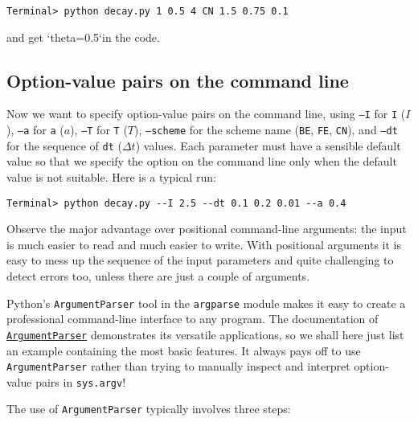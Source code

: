 \documentclass[graybox,sectrefs,envcountresetchap,open=right,final]{svmonodo}
\begin{document}
\begin{Verbatim}[frame=lines,label=\fbox{{\tiny Terminal}},framesep=2.5mm,framerule=0.7pt,fontsize=\fontsize{9pt}{9pt}]
Terminal> python decay.py 1 0.5 4 CN 1.5 0.75 0.1
\end{Verbatim}
and get `theta=0.5`in the code.


\subsection{Option-value pairs on the command line}


Now we want to specify option-value pairs on the command line,
using \texttt{--I} for \texttt{I} ($I$), \texttt{--a} for \texttt{a} ($a$), \texttt{--T} for \texttt{T} ($T$),
\texttt{--scheme} for the scheme name (\texttt{BE}, \texttt{FE}, \texttt{CN}),
and \texttt{--dt} for the sequence of \texttt{dt} ($\Delta t$) values.
Each parameter must have a sensible default value so
that we specify the option on the command line only when the default
value is not suitable. Here is a typical run:

\begin{Verbatim}[frame=lines,label=\fbox{{\tiny Terminal}},framesep=2.5mm,framerule=0.7pt,fontsize=\fontsize{9pt}{9pt}]
Terminal> python decay.py --I 2.5 --dt 0.1 0.2 0.01 --a 0.4
\end{Verbatim}
Observe the major advantage over positional command-line arguments:
the input is much easier to read and much easier to write.
With positional arguments it is easy to mess up the sequence of
the input parameters and quite challenging to detect errors too,
unless there are just a couple of arguments.

Python's \texttt{ArgumentParser} tool in the \texttt{argparse} module makes it easy
to create a professional command-line interface to any program. The
documentation of \href{{http://docs.python.org/library/argparse.html}}{\nolinkurl{ArgumentParser}} demonstrates its
versatile applications, so we shall here just list an example
containing the most basic features. It always pays off to use \texttt{ArgumentParser}
rather than trying to manually inspect and interpret option-value pairs
in \texttt{sys.argv}!

The use of \texttt{ArgumentParser} typically involves three steps:
\end{document}
